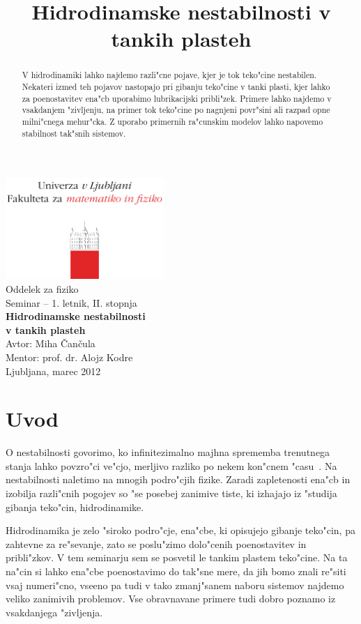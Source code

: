 \documentclass[a4paper,12pt]{article}
\title{Hidrodinamske nestabilnosti v tankih plasteh}
\begin{document}
\begin{center}
\includegraphics[width=6cm]{../logo_fmf_uni-lj_sl}\\[0.5cm]
Oddelek za fiziko \\[2cm]
{ \large Seminar -- 1. letnik, II. stopnja } \\[1cm]
{ \huge \bf Hidrodinamske nestabilnosti \\ v tankih plasteh}\\[2cm]
{\large Avtor: Miha \v Can\v cula}\\[0.6cm]
{\large Mentor: prof. dr. Alojz Kodre} \\[0.6cm]
{\large Ljubljana, marec 2012}
\end{center}
\vfill

\begin{abstract}

V hidrodinamiki lahko najdemo razli"cne pojave, kjer je tok teko"cine nestabilen. Nekateri izmed teh pojavov nastopajo pri gibanju teko"cine v tanki plasti, kjer lahko za poenostavitev ena"cb uporabimo lubrikacijski pribli"zek. Primere lahko najdemo v vsakdanjem "zivljenju, na primer tok teko"cine po nagnjeni povr"sini ali razpad opne milni"cnega mehur"cka. Z uporabo primernih ra"cunskim modelov lahko napovemo stabilnost tak"snih sistemov. 


\end{abstract}

\newpage

\tableofcontents

\section{Uvod}

O nestabilnosti govorimo, ko infinitezimalno majhna sprememba trenutnega stanja lahko povzro"ci ve"cjo, merljivo razliko po nekem kon"cnem "casu~\cite{drazin}. Na nestabilnosti naletimo na mnogih podro"cjih fizike. Zaradi zapletenosti ena"cb in izobilja razli"cnih pogojev so "se posebej zanimive tiste, ki izhajajo iz "studija gibanja teko"cin, hidrodinamike. 

Hidrodinamika je zelo "siroko podro"cje, ena"cbe, ki opisujejo gibanje teko"cin, pa zahtevne za re"sevanje, zato se poslu"zimo dolo"cenih poenostavitev in pribli"zkov. V tem seminarju sem se posvetil le tankim plastem teko"cine. Na ta na"cin si lahko ena"cbe poenostavimo do tak"sne mere, da jih bomo znali re"siti vsaj numeri"cno, vseeno pa tudi v tako zmanj"sanem naboru sistemov najdemo veliko zanimivih problemov. Vse obravnavane primere tudi dobro poznamo iz vsakdanjega "zivljenja. 
\end{document}
